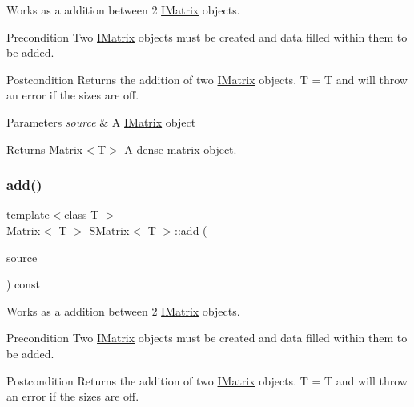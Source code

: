 Works as a addition between 2 \mbox{\hyperlink{class_i_matrix}{I\+Matrix}} objects. 

\begin{DoxyPrecond}{Precondition}
Two \mbox{\hyperlink{class_i_matrix}{I\+Matrix}} objects must be created and data filled within them to be added. 
\end{DoxyPrecond}
\begin{DoxyPostcond}{Postcondition}
Returns the addition of two \mbox{\hyperlink{class_i_matrix}{I\+Matrix}} objects. T = T and will throw an error if the sizes are off.
\end{DoxyPostcond}

\begin{DoxyParams}{Parameters}
{\em source} & A \mbox{\hyperlink{class_i_matrix}{I\+Matrix}} object \\
\hline
\end{DoxyParams}
\begin{DoxyReturn}{Returns}
Matrix$<$\+T$>$ A dense matrix object. 
\end{DoxyReturn}
\mbox{\label{class_s_matrix_afeb78de40327150348c31deb20ebcc6d}} 
\subsubsection{\texorpdfstring{add()}{add()}\hspace{0.1cm}{\footnotesize\ttfamily [5/6]}}
{\footnotesize\ttfamily template$<$class T $>$ \\
\mbox{\hyperlink{class_matrix}{Matrix}}$<$ T $>$ \mbox{\hyperlink{class_s_matrix}{S\+Matrix}}$<$ T $>$\+::add (\begin{DoxyParamCaption}\item[{const \mbox{\hyperlink{class_i_matrix}{I\+Matrix}}$<$ \mbox{\hyperlink{class_s_matrix}{S\+Matrix}}$<$ T $>$, T $>$ \&}]{source }\end{DoxyParamCaption}) const\hspace{0.3cm}{\ttfamily [virtual]}}



Works as a addition between 2 \mbox{\hyperlink{class_i_matrix}{I\+Matrix}} objects. 

\begin{DoxyPrecond}{Precondition}
Two \mbox{\hyperlink{class_i_matrix}{I\+Matrix}} objects must be created and data filled within them to be added. 
\end{DoxyPrecond}
\begin{DoxyPostcond}{Postcondition}
Returns the addition of two \mbox{\hyperlink{class_i_matrix}{I\+Matrix}} objects. T = T and will throw an error if the sizes are off.
\end{DoxyPostcond}

